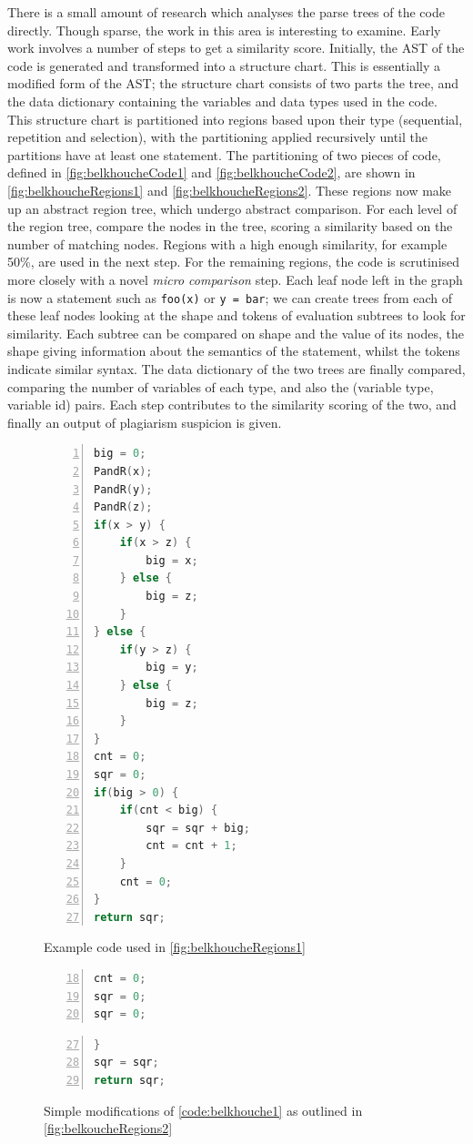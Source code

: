 There is a small amount of research which analyses the parse trees
of the code directly. Though sparse, the work in this area is interesting
to examine. Early work \cite{Belkhouche} involves a number of steps to get
a similarity score. Initially, the AST of the code is generated and transformed
into a structure chart. This is essentially a modified form of the AST;
the structure chart consists of two parts the tree, and the data dictionary
containing the variables and data types used in the code\cite{Belkhouche}. This structure
chart is partitioned into regions based upon their type (sequential, repetition
and selection), with the partitioning applied recursively until the partitions
have at least one statement. The partitioning of two pieces of code, defined in
\cref{fig:belkhoucheCode1} and \cref{fig:belkhoucheCode2}, are shown in
\cref{fig:belkhoucheRegions1} and \cref{fig:belkhoucheRegions2}. These regions
now make up an abstract region tree, which undergo abstract comparison. For
each level of the region tree, compare the nodes in the tree, scoring a similarity
based on the number of matching nodes. Regions with a high enough similarity,
for example 50\%, are used in the next step. For the remaining regions, the code
is scrutinised more closely with a novel \emph{micro comparison} step. Each
leaf node left in the graph is now a statement such as \texttt{foo(x)} or
\texttt{y = bar}; we can create trees from each of these leaf nodes
looking at the shape and tokens of evaluation subtrees to look for similarity. 
Each subtree can be compared on shape and the value of its nodes, the shape
giving information about the semantics of the statement, whilst the tokens
indicate similar syntax.
The data dictionary of the two trees are finally compared, comparing the number
of variables of each type, and also the (variable type, variable id) pairs.
Each step contributes to the similarity scoring of the two, and finally an output
of plagiarism suspicion is given.

\begin{figure}[p]
\begin{lstlisting}[language=C, numbers=left]
big = 0;
PandR(x);
PandR(y);
PandR(z);
if(x > y) {
	if(x > z) {
		big = x;
	} else {
		big = z;
	}
} else {
	if(y > z) {
		big = y;
	} else {
		big = z;
	}
}
cnt = 0;
sqr = 0;
if(big > 0) {
	if(cnt < big) {
		sqr = sqr + big;
		cnt = cnt + 1;
	}
	cnt = 0;
}
return sqr;
\end{lstlisting}
\caption{Example code used in \cref{fig:belkhoucheRegions1}}
\label{code:belkhouche1}

\begin{lstlisting}[firstnumber=18, language=C, numbers=left]
cnt = 0;
sqr = 0;
sqr = 0;
\end{lstlisting}

\begin{lstlisting}[firstnumber=27, language=C, numbers=left]
}
sqr = sqr;
return sqr;
\end{lstlisting}
\caption{Simple modifications of \cref{code:belkhouche1} as outlined in
\cref{fig:belkoucheRegions2}}
\label{code:belkhouche2}
\end{figure}


